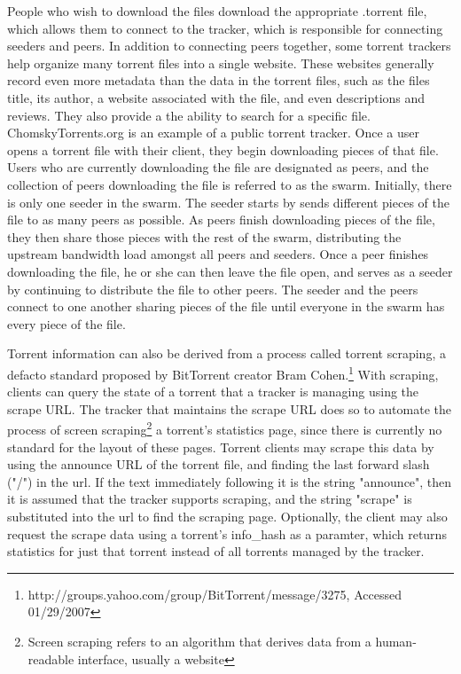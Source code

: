 \documentclass[a4paper,12pt]{report}
\begin{document}
People who wish to download the files download the appropriate .torrent file, which allows them to connect to the tracker, which is responsible for connecting seeders and peers.
In addition to connecting peers together, some torrent trackers help organize many torrent files into a single website. These websites generally record even more metadata than the data in the torrent files, such as the files title, its author, a website associated with the file, and even descriptions and reviews.
They also provide a the ability to search for a specific file. ChomskyTorrents.org is an example of a public torrent tracker.
Once a user opens a torrent file with their client, they begin downloading pieces of that file.
Users who are currently downloading the file are designated as peers, and the collection of peers downloading the file is referred to as the swarm.
Initially, there is only one seeder in the swarm.
The seeder starts by sends different pieces of the file to as many peers as possible. 
As peers finish downloading pieces of the file, they then share those pieces with the rest of the swarm, distributing the upstream bandwidth load amongst all peers and seeders. 
Once a peer finishes downloading the file, he or she can then leave the file open, and serves as a seeder by continuing to distribute the file to other peers.
The seeder and the peers connect to one another sharing pieces of the file until everyone in the swarm has every piece of the file.

Torrent information can also be derived from a process called torrent scraping, a defacto standard proposed by BitTorrent creator Bram Cohen.\footnote{http://groups.yahoo.com/group/BitTorrent/message/3275, Accessed 01/29/2007}
With scraping, clients can query the state of a torrent that a tracker is managing using the scrape URL. 
The tracker that maintains the scrape URL does so to automate the process of screen scraping\footnote{Screen scraping refers to an algorithm that derives data from a human-readable interface, usually a website} a torrent's statistics page, since there is currently no standard for the layout of these pages. 
Torrent clients may scrape this data by using the announce URL of the torrent file, and finding the last forward slash ("/") in the url. 
If the text immediately following it is the string "announce", then it is assumed that the tracker supports scraping, and the string "scrape" is substituted into the url to find the scraping page. 
Optionally, the client may also request the scrape data using a torrent's info_hash as a paramter, which returns statistics for just that torrent instead of all torrents managed by the tracker. 
\end{document}
